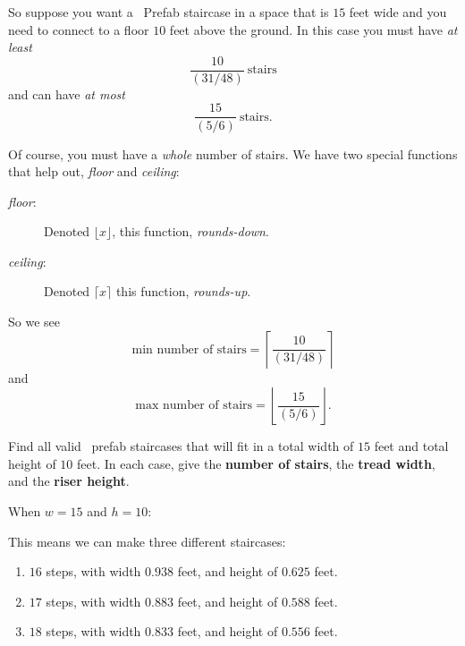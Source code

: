\documentclass[noauthor,nooutcomes,handout]{ximera}
\begin{document}
So suppose you want a \mooculus~Prefab staircase in a space that is
$15$ feet wide and you need to connect to a floor $10$ feet above the
ground. In this case you must have \emph{at least}
\[
\frac{10}{\left(31/48\right)} \ \text{stairs}
\]
and can have \emph{at most}
\[
\frac{15}{\left(5/6\right)} \ \text{stairs}.
\]


Of course, you must have a \emph{whole} number of stairs. We have two special functions that help out, \emph{floor} and \emph{ceiling}:
\begin{description}
\item[\emph{floor}:] Denoted $\lfloor x\rfloor$, this function, \emph{rounds-down}.
\item[\emph{ceiling}:] Denoted $\lceil x\rceil$ this function, \emph{rounds-up}.
\end{description}
So we see
\[
\text{min number of stairs} = \left\lceil \frac{10}{\left(31/48\right)} \right\rceil
\]
and
\[
\text{max number of stairs} = \left\lfloor \frac{15}{\left(5/6\right)} \right\rfloor.
\]


\mynewpage


\begin{question}
  Find all valid \mooculus~prefab staircases that will fit in a total
  width of $15$ feet and total height of $10$ feet. In each case, give
  the \textbf{number of stairs}, the \textbf{tread width}, and the
  \textbf{riser height}.

  \begin{freeResponse}
  When $w=15$ and $h=10$:
  
  This means we can make three different staircases:
  \begin{enumerate}
  \item $16$ steps, with width $0.938$ feet, and height of $0.625$ feet.
  \item $17$ steps, with width $0.883$ feet, and height of $0.588$ feet.
  \item $18$ steps, with width $0.833$ feet, and height of $0.556$ feet.
  \end{enumerate}
  \end{freeResponse}
\end{question}


\mynewpage
\end{document}
